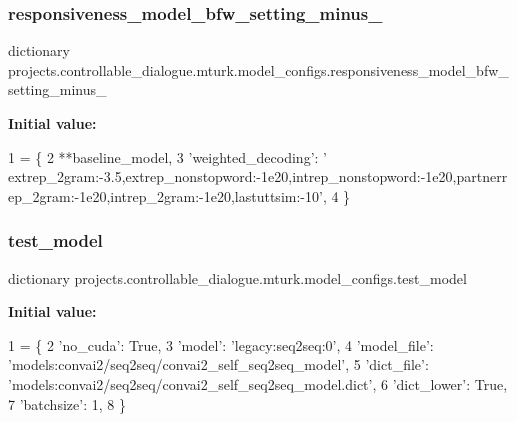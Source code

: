 \subsubsection{\texorpdfstring{responsiveness\+\_\+model\+\_\+bfw\+\_\+setting\+\_\+minus\+\_}{responsiveness\_model\_bfw\_setting\_minus\_10}}
{\footnotesize\ttfamily dictionary projects.\+controllable\+\_\+dialogue.\+mturk.\+model\+\_\+configs.\+responsiveness\+\_\+model\+\_\+bfw\+\_\+setting\+\_\+minus\+\_}

{\bfseries Initial value\+:}
\begin{DoxyCode}
1 =  \{
2     **baseline\_model,
3     \textcolor{stringliteral}{'weighted\_decoding'}: \textcolor{stringliteral}{'
      extrep\_2gram:-3.5,extrep\_nonstopword:-1e20,intrep\_nonstopword:-1e20,partnerrep\_2gram:-1e20,intrep\_2gram:-1e20,lastuttsim:-10'},
4 \}
\end{DoxyCode}
\mbox{\label{namespaceprojects_1_1controllable__dialogue_1_1mturk_1_1model__configs_aca29ef10b645ef9cea9501f588e59bc7}} 
\subsubsection{\texorpdfstring{test\+\_\+model}{test\_model}}
{\footnotesize\ttfamily dictionary projects.\+controllable\+\_\+dialogue.\+mturk.\+model\+\_\+configs.\+test\+\_\+model}

{\bfseries Initial value\+:}
\begin{DoxyCode}
1 =  \{
2     \textcolor{stringliteral}{'no\_cuda'}: \textcolor{keyword}{True},
3     \textcolor{stringliteral}{'model'}: \textcolor{stringliteral}{'legacy:seq2seq:0'},
4     \textcolor{stringliteral}{'model\_file'}: \textcolor{stringliteral}{'models:convai2/seq2seq/convai2\_self\_seq2seq\_model'},
5     \textcolor{stringliteral}{'dict\_file'}: \textcolor{stringliteral}{'models:convai2/seq2seq/convai2\_self\_seq2seq\_model.dict'},
6     \textcolor{stringliteral}{'dict\_lower'}: \textcolor{keyword}{True},
7     \textcolor{stringliteral}{'batchsize'}: 1,
8 \}
\end{DoxyCode}
